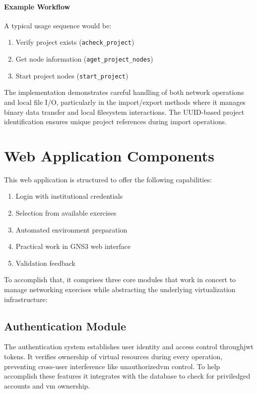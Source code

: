         \paragraph{Example Workflow}

        A typical usage sequence would be:

        \begin{enumerate}
            \item Verify project exists (\texttt{acheck\_project})
            \item Get node information (\texttt{aget\_project\_nodes})
            \item Start project nodes (\texttt{start\_project})
        \end{enumerate}

        The implementation demonstrates careful handling of both network operations and local file I/O, 
        particularly in the import/export methods where it manages binary data transfer and local filesystem 
        interactions. The UUID-based project identification ensures unique project references during import 
        operations.

\section{Web Application Components}
    This web application is structured to offer the following capabilities:
        \begin{enumerate}
            \item Login with institutional credentials
            \item Selection from available exercises
            \item Automated environment preparation
            \item Practical work in GNS3 web interface
            \item Validation feedback
        \end{enumerate}

    To accomplish that, it comprises three core modules that work in concert to manage networking exercises while 
    abstracting the underlying virtualization infrastructure:

    \subsection{Authentication Module}
        The authentication system establishes user identity and access control through\ac{jwt} tokens. It 
        verifies ownership of virtual resources during every operation, preventing cross-user interference 
        like unauthorized\ac{vm} control. To help accomplish these features it integrates with the database to 
        check for priviledged accounts and vm ownership.


